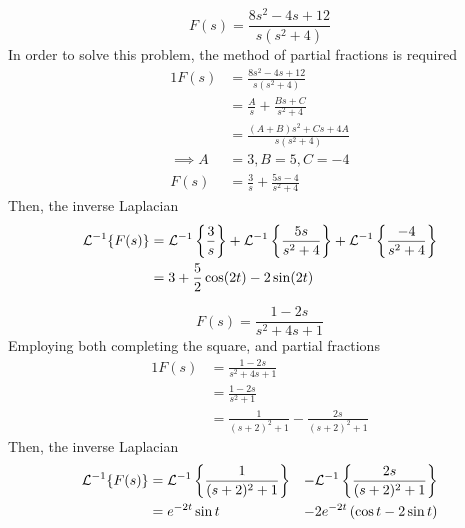 \documentclass[diffeq.tex]{subfiles}
\begin{document}
    \begin{example}
        \begin{equation}
            F(s) = \frac{8s^{2} - 4s + 12}{s(s^{2} + 4)}
        \end{equation}
        In order to solve this problem, the method of partial fractions is required
        \begin{alignat}{1}
            F(s) &= \frac{8s^{2} - 4s + 12}{s(s^{2} + 4)}\\
            &= \frac{A}{s} + \frac{Bs + C}{s^{2} + 4}\\
            &= \frac{(A+B)s^{2} + Cs + 4A}{s(s^{2} + 4)}\\
            \implies A &= 3, B = 5, C = -4\\
            F(s) &= \frac{3}{s} + \frac{5s - 4}{s^{2} + 4}
        \end{alignat}
        Then, the inverse Laplacian
        \begin{alignat}{1}
            \mathcal{L}^{-1}\{F(s)\} &= \mathcal{L}^{-1}\left\{\frac{3}{s}\right\} + \mathcal{L}^{-1}\left\{\frac{5s}{s^{2} + 4}\right\} + \mathcal{L}^{-1}\left\{\frac{-4}{s^{2} + 4}\right\}\\
            &= 3 + \frac{5}{2}\cos(2t) - 2\sin(2t)
        \end{alignat}
    \end{example}
    \begin{example}
        \begin{equation}
            F(s) = \frac{1-2s}{s^{2} + 4s + 1}
        \end{equation}
        Employing both completing the square, and partial fractions
        \begin{alignat}{1}
            F(s) &= \frac{1-2s}{s^{2} + 4s + 1}\\
            &= \frac{1 - 2s}{s^{2} + 1}\\
            &= \frac{1}{(s + 2)^{2} + 1} - \frac{2s}{(s + 2)^{2} + 1}
        \end{alignat}
        Then, the inverse Laplacian
        \begin{alignat}{2}
            \mathcal{L}^{-1}\{F(s)\} &= \mathcal{L}^{-1}\left\{\frac{1}{(s + 2)^{2} + 1}\right\} &- \mathcal{L}^{-1}\left\{\frac{2s}{(s + 2)^{2} + 1}\right\}\\
            &= e^{-2t}\sin t &- 2e^{-2t}\left(\cos t - 2\sin t\right)
        \end{alignat}
    \end{example}
    \np
\end{document}
